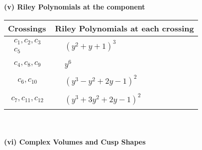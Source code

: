 \documentclass[1p]{elsarticle_modified}
\theoremstyle{definition}
\begin{document}
\newpage\renewcommand{\arraystretch}{1}
\flushleft \textbf{(v) Riley Polynomials at the component}\newline \\
\begin{tabular}{m{50pt}|m{274pt}}
Crossings & \hspace{64pt}Riley Polynomials at each crossing \\
\hline $$\begin{aligned}c_{1},c_{2},c_{3}\\c_{5}\end{aligned}$$&$\begin{aligned}
&(y^2+y+1)^3
\end{aligned}$\\
\hline $$\begin{aligned}c_{4},c_{8},c_{9}\end{aligned}$$&$\begin{aligned}
&y^6
\end{aligned}$\\
\hline $$\begin{aligned}c_{6},c_{10}\end{aligned}$$&$\begin{aligned}
&(y^3- y^2+2 y-1)^2
\end{aligned}$\\
\hline $$\begin{aligned}c_{7},c_{11},c_{12}\end{aligned}$$&$\begin{aligned}
&(y^3+3 y^2+2 y-1)^2
\end{aligned}$\\
\hline
\end{tabular}\\~\\
\newpage\flushleft \textbf{(vi) Complex Volumes and Cusp Shapes}
\end{document}
